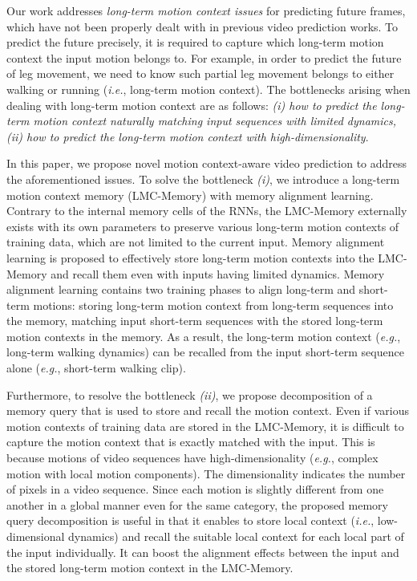 \documentclass[final]{cvpr}
\begin{document}
Our work addresses \textit{long-term motion context issues} for predicting future frames, which have not been properly dealt with in previous video prediction works. To predict the future precisely, it is required to capture which long-term motion context the input motion belongs to. For example, in order to predict the future of leg movement, we need to know such partial leg movement belongs to either walking or running (\textit{i.e.}, long-term motion context). The bottlenecks arising when dealing with long-term motion context are as follows: \textit{(i) how to predict the long-term motion context naturally matching input sequences with limited dynamics, (ii) how to predict the long-term motion context with high-dimensionality}.

In this paper, we propose novel motion context-aware video prediction to address the aforementioned issues. To solve the bottleneck \textit{(i)}, we introduce a long-term motion context memory (LMC-Memory) with memory alignment learning. Contrary to the internal memory cells of the RNNs, the LMC-Memory externally exists with its own parameters to preserve various long-term motion contexts of training data, which are not limited to the current input. Memory alignment learning is proposed to effectively store long-term motion contexts into the LMC-Memory and recall them even with inputs having limited dynamics. Memory alignment learning contains two training phases to align long-term and short-term motions:  storing long-term motion context from long-term sequences into the memory,  matching input short-term sequences with the stored long-term motion contexts in the memory. As a result, the long-term motion context (\textit{e.g.}, long-term walking dynamics) can be recalled from the input short-term sequence alone (\textit{e.g.}, short-term walking clip).

Furthermore, to resolve the bottleneck \textit{(ii)}, we propose decomposition of a memory query that is used to store and recall the motion context. Even if various motion contexts of training data are stored in the LMC-Memory, it is difficult to capture the motion context that is exactly matched with the input. This is because motions of video sequences have high-dimensionality (\textit{e.g.}, complex motion with local motion components). The dimensionality indicates the number of pixels in a video sequence. Since each motion is slightly different from one another in a global manner even for the same category, the proposed memory query decomposition is useful in that it enables to store local context (\textit{i.e.}, low-dimensional dynamics) and recall the suitable local context for each local part of the input individually. It can boost the alignment effects between the input and the stored long-term motion context in the LMC-Memory.
\end{document}
